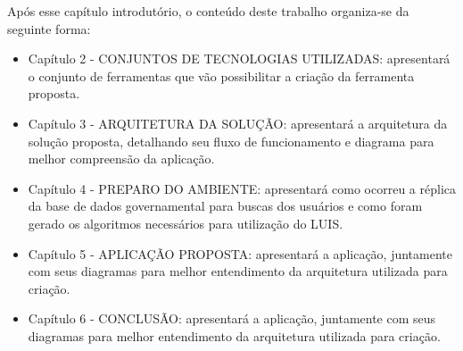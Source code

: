 Após esse capítulo introdutório, o conteúdo deste trabalho organiza-se da seguinte forma:
\begin{itemize}
	\item Capítulo 2 - \uppercase{Conjuntos de tecnologias utilizadas}: apresentará o conjunto de ferramentas que vão possibilitar a criação da ferramenta proposta.
	\item Capítulo 3 - \uppercase{Arquitetura da solução}: apresentará a arquitetura da solução proposta, detalhando seu fluxo de funcionamento e diagrama para melhor compreensão da aplicação.
	\item Capítulo 4 - \uppercase{Preparo do ambiente}: apresentará como ocorreu a réplica da base de dados governamental para buscas dos usuários e como foram gerado os algoritmos necessários para utilização do LUIS.
	\item Capítulo 5 - \uppercase{Aplicação proposta}: apresentará a aplicação, juntamente com seus diagramas para melhor entendimento da arquitetura utilizada para criação.
	\item Capítulo 6 - \uppercase{Conclusão}: apresentará a aplicação, juntamente com seus diagramas para melhor entendimento da arquitetura utilizada para criação.
\end{itemize}

